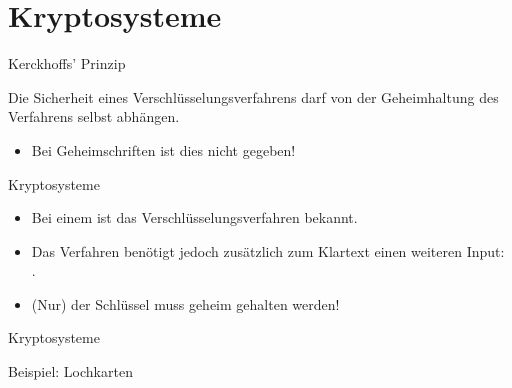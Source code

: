 \section{Kryptosysteme}

\begin{frame}[text=large]{Kerckhoffs' Prinzip}
  \begin{concept}
    Die Sicherheit eines Verschlüsselungsverfahrens darf  von der Geheimhaltung des Verfahrens
    selbst abhängen.
  \end{concept}
  \begin{itemize}
    \item Bei Geheimschriften ist dies nicht gegeben!
  \end{itemize}
\end{frame}

\begin{frame}[text=large]{Kryptosysteme}
  \begin{itemize}
    \item Bei einem  ist das Verschlüsselungsverfahren bekannt.
    \item Das Verfahren benötigt jedoch zusätzlich zum Klartext einen weiteren Input: .
    \item (Nur) der Schlüssel muss geheim gehalten werden!
  \end{itemize}
\end{frame}

\begin{frame}{Kryptosysteme}
  \vspace*{1mm}
  \centering{}
\end{frame}

\begin{frame}{Beispiel: Lochkarten}
  \centering\vspace*{4mm}
\end{frame}

